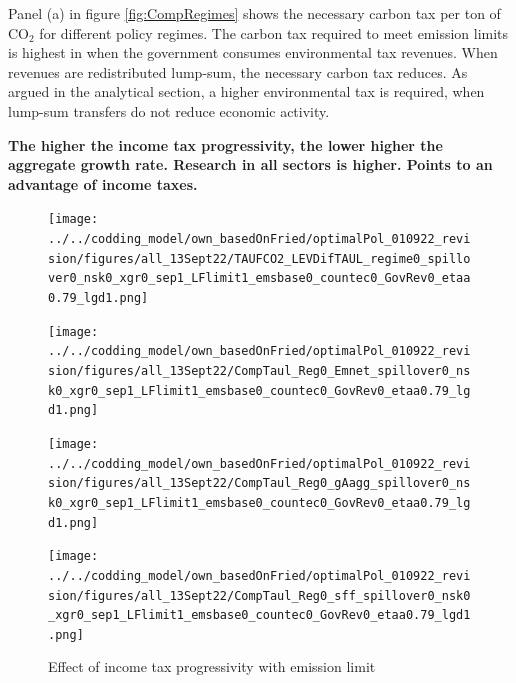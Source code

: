 
Panel (a) in figure \ref{fig:CompRegimes} shows the necessary carbon tax per ton of CO$_2$ for different policy regimes. The carbon tax required to meet emission limits is highest in when the government consumes environmental tax revenues. When revenues are redistributed lump-sum, the necessary carbon tax reduces. As argued in the analytical section, a higher environmental tax is required, when lump-sum transfers do not reduce economic activity. 

\textbf{The higher the income tax progressivity, the lower higher the aggregate growth rate. Research in all sectors is higher. \ar Points to an advantage of income taxes.}
\begin{figure}[h!!]
	\centering
	\caption{Effect of income tax progressivity with emission limit }\label{fig:CompTaul_TAUF}
	\begin{minipage}[]{0.32\textwidth}
		\texttt{[image: ../../codding\_model/own\_basedOnFried/optimalPol\_010922\_revision/figures/all\_13Sept22/TAUFCO2\_LEVDifTAUL\_regime0\_spillover0\_nsk0\_xgr0\_sep1\_LFlimit1\_emsbase0\_countec0\_GovRev0\_etaa0.79\_lgd1.png]}
	\end{minipage}	
\begin{minipage}[]{0.32\textwidth}
\texttt{[image: ../../codding\_model/own\_basedOnFried/optimalPol\_010922\_revision/figures/all\_13Sept22/CompTaul\_Reg0\_Emnet\_spillover0\_nsk0\_xgr0\_sep1\_LFlimit1\_emsbase0\_countec0\_GovRev0\_etaa0.79\_lgd1.png]}
\end{minipage}	
\begin{minipage}[]{0.32\textwidth}
\texttt{[image: ../../codding\_model/own\_basedOnFried/optimalPol\_010922\_revision/figures/all\_13Sept22/CompTaul\_Reg0\_gAagg\_spillover0\_nsk0\_xgr0\_sep1\_LFlimit1\_emsbase0\_countec0\_GovRev0\_etaa0.79\_lgd1.png]}
\end{minipage}
\begin{minipage}[]{0.32\textwidth}
\texttt{[image: ../../codding\_model/own\_basedOnFried/optimalPol\_010922\_revision/figures/all\_13Sept22/CompTaul\_Reg0\_sff\_spillover0\_nsk0\_xgr0\_sep1\_LFlimit1\_emsbase0\_countec0\_GovRev0\_etaa0.79\_lgd1.png]}

\end{minipage}
\end{figure}
